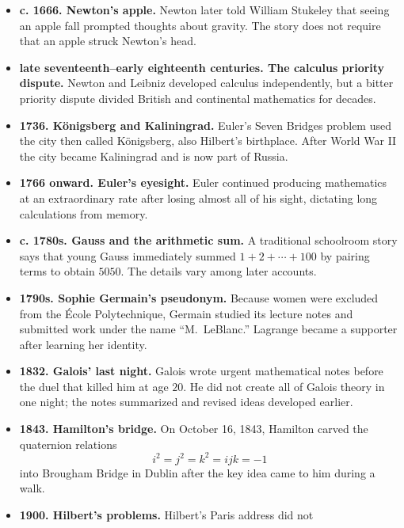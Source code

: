 \begin{itemize}
        \item \textbf{c. 1666. Newton's apple.} Newton later told William Stukeley that
              seeing an apple fall prompted thoughts about gravity. The story
              does not require that an apple struck Newton's head.
        \item \textbf{late seventeenth--early eighteenth centuries. The calculus
              priority dispute.} Newton and Leibniz
              developed calculus independently, but a bitter priority dispute
              divided British and continental mathematics for decades.
        \item \textbf{1736. Königsberg and Kaliningrad.} Euler's Seven Bridges
              problem used the city then called Königsberg, also Hilbert's
              birthplace. After World War II the city became Kaliningrad and is
              now part of Russia.
        \item \textbf{1766 onward. Euler's eyesight.} Euler continued producing mathematics
              at an extraordinary rate after losing almost all of his sight,
              dictating long calculations from memory.
        \item \textbf{c. 1780s. Gauss and the arithmetic sum.} A traditional schoolroom
              story says that young Gauss immediately summed
              $1+2+\cdots+100$ by pairing terms to obtain $5050$. The details
              vary among later accounts.
        \item \textbf{1790s. Sophie Germain's pseudonym.} Because women were excluded
              from the École Polytechnique, Germain studied its lecture notes
              and submitted work under the name ``M.\ LeBlanc.'' Lagrange
              became a supporter after learning her identity.
        \item \textbf{1832. Galois' last night.} Galois wrote urgent mathematical
              notes before the duel that killed him at age $20$. He did not
              create all of Galois theory in one night; the notes summarized
              and revised ideas developed earlier.
        \item \textbf{1843. Hamilton's bridge.} On October 16, 1843, Hamilton carved
              the quaternion relations
              \[
                  i^2=j^2=k^2=ijk=-1
              \]
              into Brougham Bridge in Dublin after the key idea came to him
              during a walk.
        \item \textbf{1900. Hilbert's problems.} Hilbert's Paris address did not

\end{itemize}
